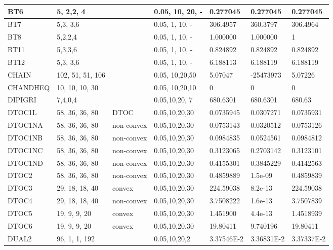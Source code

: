 \begin{landscape}
\begin{longtable}{l | l |  l  |  >{\footnotesize}p{3cm} | l | l | l    }
BT6  &  5, 2,2, 4  &  & 0.05, 10, 20, -  & 0.277045  & 0.277045  & 0.277045   \\ \hline
BT7  &  5,3, 3,6   & & 0.05, 1, 10, -   & 306.4957 & 360.3797  & 306.4964  \\ \hline
BT8  & 5,2,2,4   & & 0.05, 1, 10, -  & 1.000000  & 1.000000  & 1   \\ \hline
BT11 &  5,3,3,6  & & 0.05, 1, 10, -  &  0.824892 &  0.824892 & 0.824892   \\ \hline
BT12  &   5,3, 3,6 &&  0.05, 1, 10, - & 6.188113 &  6.188119 & 6.188119   \\ \hline
CHAIN & 102, 51, 51, 106 & &     0.05, 10,20,50 & 5.07047 & -25473973 & 5.07226  \\ \hline
CHANDHEQ &  10, 10, 10, 30 & &  0.05, 10,20,10 & 0  & 0  & 0   \\ \hline
DIPIGRI &7,4,0,4  & & 0.05,10,20, 7  &  680.6301 &  680.6301 & 680.63   \\ \hline
DTOC1L &  58, 36, 36, 80 & DTOC & 0.05,10,20,30 &0.0735945   &0.0307271  & 0.0735931 \\ \hline
DTOC1NA &  58, 36, 36, 80 &non-convex  & 0.05,10,20,30&  0.0753143   &0.0320512  & 0.0753126 \\ \hline
DTOC1NB & 58, 36, 36, 80 &non-convex   & 0.05,10,20,30 &0.0984835   &0.0524561  & 0.0984812 \\ \hline
DTOC1NC & 58, 36, 36, 80 & non-convex  & 0.05,10,20,30 &0.3123065    & 0.2703142   &  0.3123101 \\ \hline
DTOC1ND &  58, 36, 36, 80 & non-convex  & 0.05,10,20,30& 0.4155301   &  0.3845229   &  0.4142563 \\ \hline
DTOC2 &  58, 36, 36, 80 & non-convex  & 0.05,10,20,30 &     0.4859889   &  1.5e-09  &  0.4859839 \\ \hline
DTOC3 &  29, 18, 18, 40 & convex  & 0.05,10,20,30      &     224.59038   &  8.2e-13  &  224.59038 \\ \hline
DTOC4 & 29, 18, 18, 40 &non-convex  & 0.05,10,20,30&      3.7508222  &   1.6e-13  &  3.7507839 \\ \hline
DTOC5  &  19, 9, 9, 20 &convex  & 0.05,10,20,30 &  1.451900  &   4.4e-13  & 1.4518939 \\ \hline
DTOC6 &  19, 9, 9, 20 &convex  &  0.05,10,20,30 & 19.80411 &  9.740196 & 19.80411 \\ \hline
DUAL2 & 96, 1, 1, 192 &    &  0.05,10,20,2 &  3.37546E-2 & 3.36831E-2 &    3.37337E-2 \\ \hline

\end{longtable}
\end{landscape}
